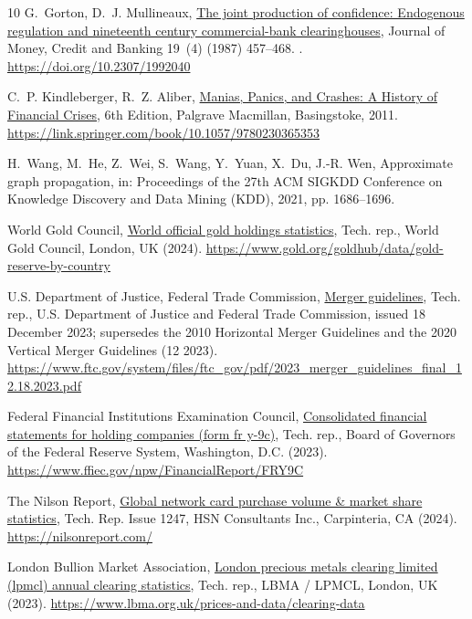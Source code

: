 \documentclass[final,5p,times]{elsarticle}
\begin{document}
\begin{thebibliography}{10}
G.~Gorton, D.~J. Mullineaux, \href{https://doi.org/10.2307/1992040}{The joint production of confidence: Endogenous regulation and nineteenth century commercial-bank clearinghouses}, Journal of Money, Credit and Banking 19~(4) (1987) 457--468.
\newblock \href {https://doi.org/10.2307/1992040} {}.
\newline\urlprefix\url{https://doi.org/10.2307/1992040}

C.~P. Kindleberger, R.~Z. Aliber, \href{https://link.springer.com/book/10.1057/9780230365353}{Manias, Panics, and Crashes: A History of Financial Crises}, 6th Edition, Palgrave Macmillan, Basingstoke, 2011.
\newline\urlprefix\url{https://link.springer.com/book/10.1057/9780230365353}

H.~Wang, M.~He, Z.~Wei, S.~Wang, Y.~Yuan, X.~Du, J.-R. Wen, Approximate graph propagation, in: Proceedings of the 27th ACM SIGKDD Conference on Knowledge Discovery and Data Mining (KDD), 2021, pp. 1686--1696.

{World Gold Council}, \href{https://www.gold.org/goldhub/data/gold-reserve-by-country}{World official gold holdings statistics}, Tech. rep., World Gold Council, London, UK (2024).
\newline\urlprefix\url{https://www.gold.org/goldhub/data/gold-reserve-by-country}

{U.S. Department of Justice}, {Federal Trade Commission}, \href{https://www.ftc.gov/system/files/ftc_gov/pdf/2023_merger_guidelines_final_12.18.2023.pdf}{Merger guidelines}, Tech. rep., U.S. Department of Justice and Federal Trade Commission, issued 18 December 2023; supersedes the 2010 Horizontal Merger Guidelines and the 2020 Vertical Merger Guidelines (12 2023).
\newline\urlprefix\url{https://www.ftc.gov/system/files/ftc_gov/pdf/2023_merger_guidelines_final_12.18.2023.pdf}

{Federal Financial Institutions Examination Council}, \href{https://www.ffiec.gov/npw/FinancialReport/FRY9C}{Consolidated financial statements for holding companies (form fr y-9c)}, Tech. rep., Board of Governors of the Federal Reserve System, Washington, D.C. (2023).
\newline\urlprefix\url{https://www.ffiec.gov/npw/FinancialReport/FRY9C}

{The Nilson Report}, \href{https://nilsonreport.com/}{Global network card purchase volume \& market share statistics}, Tech. Rep. Issue 1247, HSN Consultants Inc., Carpinteria, CA (2024).
\newline\urlprefix\url{https://nilsonreport.com/}

{London Bullion Market Association}, \href{https://www.lbma.org.uk/prices-and-data/clearing-data}{London precious metals clearing limited (lpmcl) annual clearing statistics}, Tech. rep., LBMA / LPMCL, London, UK (2023).
\newline\urlprefix\url{https://www.lbma.org.uk/prices-and-data/clearing-data}

\end{thebibliography}
\end{document}
